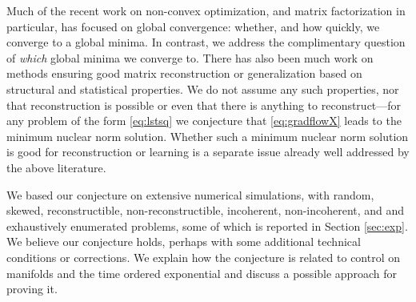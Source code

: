 Much of the recent work on non-convex optimization, and matrix factorization in particular, has focused on global convergence: whether, and how quickly, we converge to a global minima.  In contrast, we address the complimentary question of {\em which} global minima we converge to.  There has also been much work on methods ensuring good matrix reconstruction or generalization based on structural and statistical properties.  We do not assume any such properties, nor that reconstruction is possible or even that there is anything to reconstruct---for any problem of the form \eqref{eq:lstsq} we conjecture that \eqref{eq:gradflowX} leads to the minimum nuclear norm solution.  Whether such a minimum nuclear norm solution is good for reconstruction or learning is a separate issue already well addressed by the above literature.

We based our conjecture on extensive numerical simulations, with random, skewed, reconstructible, non-reconstructible, incoherent, non-incoherent, and and exhaustively enumerated problems, some of which is reported in Section \ref{sec:exp}.  We believe our conjecture holds, perhaps with some additional technical conditions or corrections.  We explain how the conjecture is related to control on manifolds and the time ordered exponential and discuss a possible approach for proving it.


